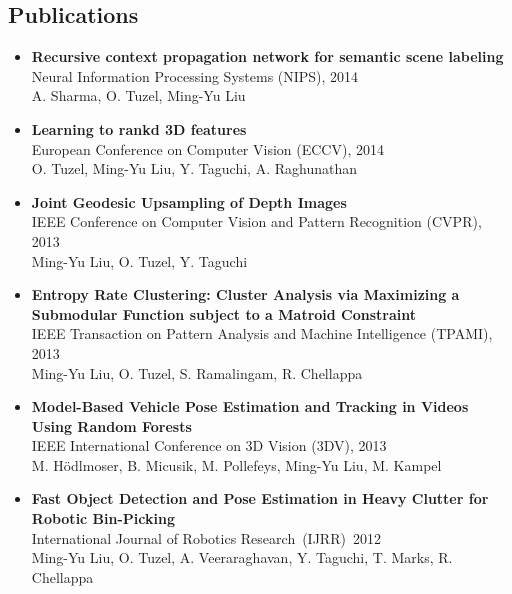 \documentclass[10pt,letterpaper]{article}
\begin{document}
\subsection*{Publications}
\begin{itemize}
\item           {\bf Recursive context propagation network for semantic scene labeling}\\
                Neural Information Processing Systems (NIPS), 2014\\
                A. Sharma, O. Tuzel, {Ming-Yu Liu}\vspace{-2mm}

\item           {\bf Learning to rankd 3D features}\\
                European Conference on Computer Vision (ECCV), 2014\\
                O. Tuzel, {Ming-Yu Liu}, Y. Taguchi, A. Raghunathan\vspace{-2mm}

\item           {\bf Joint Geodesic Upsampling of Depth Images}\\
                IEEE Conference on Computer Vision and Pattern Recognition (CVPR), 2013\\
                {Ming-Yu Liu}, O. Tuzel, Y. Taguchi\vspace{-2mm}

\item           {\bf Entropy Rate Clustering: Cluster Analysis via Maximizing a Submodular Function subject to a Matroid Constraint}\\
                IEEE Transaction on Pattern Analysis and Machine Intelligence (TPAMI), 2013\\
                {Ming-Yu Liu}, O. Tuzel, S. Ramalingam, R. Chellappa\vspace{-2mm}

\item           {\bf Model-Based Vehicle Pose Estimation and Tracking in Videos Using Random Forests}\\
                IEEE International Conference on 3D Vision (3DV), 2013\\
                M. Hödlmoser, B. Micusik, M. Pollefeys, {Ming-Yu Liu}, M. Kampel\vspace{-2mm}

\item           {\bf Fast Object Detection and Pose Estimation in Heavy Clutter for Robotic Bin-Picking}\\
                International Journal of Robotics Research~(IJRR)~2012\\
                {Ming-Yu Liu}, O. Tuzel, A. Veeraraghavan, Y. Taguchi, T. Marks, R. Chellappa\vspace{-2mm}


\end{itemize}
\end{document}
